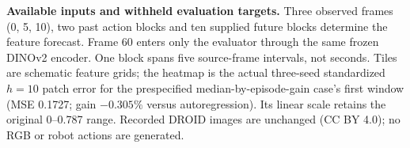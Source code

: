 \textbf{Available inputs and withheld evaluation targets.} Three observed frames (0, 5, 10), two past action blocks and ten supplied future blocks determine the feature forecast. Frame 60 enters only the evaluator through the same frozen DINOv2 encoder. One block spans five source-frame intervals, not seconds. Tiles are schematic feature grids; the heatmap is the actual three-seed standardized $h=10$ patch error for the prespecified median-by-episode-gain case's first window (MSE 0.1727; gain $-0.305\%$ versus autoregression). Its linear scale retains the original 0--0.787 range. Recorded DROID images are unchanged (CC BY 4.0); no RGB or robot actions are generated.
